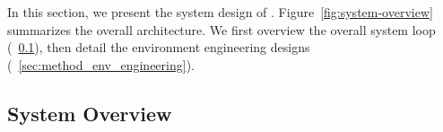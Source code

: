 \documentclass{article} %
\begin{document}
   In this section, we present the system design of \method. 
   Figure~\ref{fig:system-overview} summarizes the overall architecture.
   We first overview the overall system loop (~\ref{sec:method_system_overview}), then detail the environment engineering designs
    (~\ref{sec:method_env_engineering}).
   
   \subsection{System Overview}
   \label{sec:method_system_overview}
   
\end{document}
